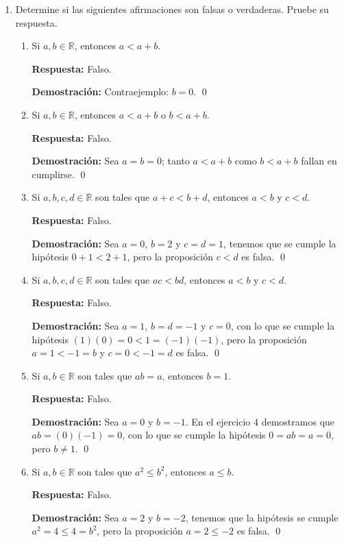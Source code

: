 \documentclass[11pt]{article}
\newcommand{\R}{\mathbb{R}}
\begin{document}
\begin{enumerate}
\item Determine si las siguientes afirmaciones son falsas o verdaderas. Pruebe su respuesta.
  \begin{enumerate}[label=(\alph*)]
    \item Si $a,b\in \R$, entonces $a<a+b$.

    \textbf{Respuesta:} Falso.

    \textbf{Demostración:} Contraejemplo: $b=0$. \qed

    \item Si $a,b\in \R$, entonces $a<a+b$ o $b<a+b$.

    \textbf{Respuesta:} Falso.

    \textbf{Demostración:}  Sea $a=b=0$; tanto $a<a+b$ como $b<a+b$ fallan en cumplirse. \qed

    \item Si $a,b,c,d\in \R$ son tales que $a+c<b+d$, entonces $a<b$ y $c<d$.

    \textbf{Respuesta:} Falso.

    \textbf{Demostración:} Sea $a=0$, $b=2$ y $c=d=1$, tenemos que se cumple la hipótesis $0+1<2+1$, pero la proposición $c<d$ es falsa. \qed

    \item Si $a,b,c,d \in \R$ son tales que $ac<bd$, entonces $a<b$ y $c<d$.

    \textbf{Respuesta:} Falso.

    \textbf{Demostración:} Sea $a=1$, $b=d=-1$ y $c=0$, con lo que se cumple la hipótesis $(1)(0)=0<1=(-1)(-1)$, pero la proposición $a=1<-1=b$ y $c=0<-1=d$ es falsa. \qed

    \item Si $a,b\in \R$ son tales que $ab=a$, entonces $b=1$.

    \textbf{Respuesta:} Falso.

    \textbf{Demostración:} Sea $a=0$ y $b=-1$. En el ejercicio 4 demostramos que $ab=(0)(-1)=0$, con lo que se cumple la hipótesis $0=ab=a=0$, pero $b\neq 1$. \qed

    \item Si $a,b\in \R$ son tales que $a^2\leq b^2$, entonces $a\leq b$.

    \textbf{Respuesta:} Falso.

    \textbf{Demostración:} Sea $a=2$ y $b=-2$, tenemos que la hipótesis se cumple $a^2=4\leq 4=b^2$, pero la proposición $a=2\leq -2$ es falsa. \qed

    \end{enumerate}


\end{enumerate}
\end{document}
